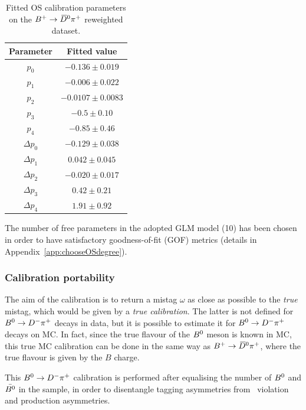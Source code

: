 \begin{table}[htbp]
        \centering
        \caption{Fitted OS calibration parameters on the $B^+\rightarrow\kern 0.2em\overline{\kern -0.2em D}{}^0\pi^+$ reweighted dataset.}
        \begin{tabular}{cc}
                \toprule
                Parameter & Fitted value \\
                \midrule
                $p_0$ & $-0.136 \pm 0.019$\\
                $p_1$ & $-0.006 \pm 0.022$\\
                $p_2$ & $-0.0107 \pm 0.0083$\\
                $p_3$ & $-0.5 \pm 0.10$\\
                $p_4$ & $-0.85 \pm 0.46$\\
                $\Delta p_0$ & $-0.129 \pm 0.038$\\
                $\Delta p_1$ & $0.042 \pm 0.045$\\
                $\Delta p_2$ & $-0.020 \pm 0.017$\\
                $\Delta p_3$ & $0.42 \pm 0.21$\\
                $\Delta p_4$ & $1.91 \pm 0.92$\\
                \bottomrule
        \end{tabular}
        \label{tab:oscalibparams}
\end{table}
The number of free parameters in the adopted GLM model (10) has been chosen in order to have  
satisfactory goodness-of-fit (GOF) metrics (details in Appendix~\ref{app:chooseOSdegree}).

\subsubsection{Calibration portability}
\label{sec:tagging:OScalib:portability}

The aim of the calibration is to return a mistag $\omega$ as close as possible to the \emph{true} mistag, which would
be given by a \emph{true calibration}. The latter is not defined for $B^0\rightarrow D^-\pi^+$ decays in data, but it is possible to estimate it 
for $B^0\rightarrow D^-\pi^+$ decays on MC. In fact, since the true flavour of the $B^0$ meson
is known in MC, this true MC calibration can be done in the same way as $B^+\rightarrow\kern 0.2em\overline{\kern -0.2em D}{}^0\pi^+$, where the true flavour is given by the $B$ charge.

This $B^0\rightarrow D^-\pi^+$ calibration is performed after equalising the number of $B^0$ and $\bar{B^0}$ in the sample, in order to disentangle
tagging asymmetries from \CP~violation and production asymmetries.

